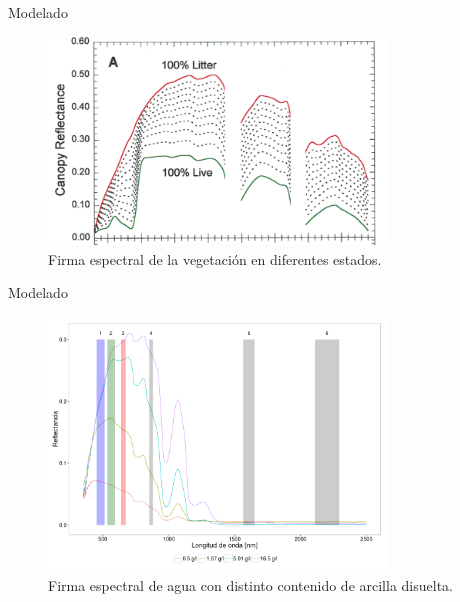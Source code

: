 \documentclass[handout]{beamer}
\begin{document}
\begin{frame}{Modelado}
    \begin{figure}
    \centering
    \includegraphics[width=0.8\textwidth]{imagenes/vivomuerto.png}
    \caption{Firma espectral de la vegetación en diferentes estados.}
    \end{figure}
\end{frame}

\begin{frame}{Modelado}
    \begin{figure}
    \centering
    \includegraphics[width=0.8\textwidth]{imagenes/waterm.png}
    \caption{Firma espectral de agua con distinto contenido de arcilla disuelta.}
    \end{figure}
\end{frame}
\end{document}
